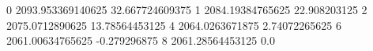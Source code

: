 0 2093.953369140625 32.667724609375
1 2084.19384765625 22.908203125
2 2075.0712890625 13.78564453125
4 2064.0263671875 2.74072265625
6 2061.00634765625 -0.279296875
8 2061.28564453125 0.0
